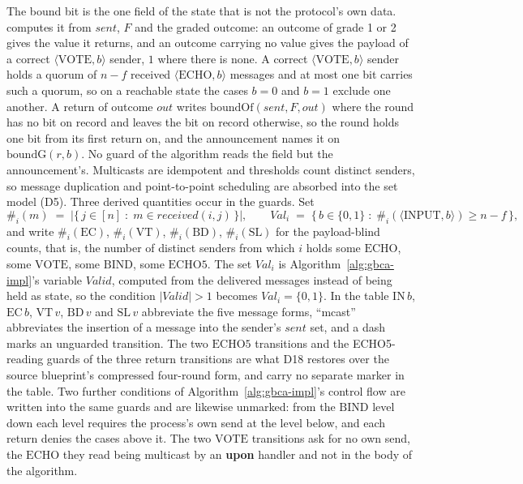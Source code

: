The bound bit is the one field of the state that is not the protocol's own data.
 computes it from $\mathit{sent}$, $F$ and the graded outcome: an outcome of grade 1 or 2 gives the value it returns, and an outcome carrying no value gives the payload of a correct $\langle\mathrm{VOTE}, b\rangle$ sender, $1$ where there is none.
A correct $\langle\mathrm{VOTE}, b\rangle$ sender holds a quorum of $n{-}f$ received $\langle\mathrm{ECHO}, b\rangle$ messages and at most one bit carries such a quorum, so on a reachable state the cases $b = 0$ and $b = 1$ exclude one another.
A return of outcome $out$ writes $\mathrm{boundOf}(\mathit{sent}, F, out)$ where the round has no bit on record and leaves the bit on record otherwise, so the round holds one bit from its first return on, and the announcement names it on $\mathrm{boundG}(r,b)$.
No guard of the algorithm reads the field but the announcement's.
Multicasts are idempotent and thresholds count distinct senders, so message duplication and point-to-point scheduling are absorbed into the set model (D5).
Three derived quantities occur in the guards.
Set
\[
  \#_i(m) \;=\; |\{\, j \in [n] \;:\; m \in \mathit{received}(i,j) \,\}|,
  \qquad
  \mathit{Val}_i \;=\;
    \{\, b \in \{0,1\} \;:\; \#_i(\langle\mathrm{INPUT}, b\rangle) \ge n - f \,\},
\]
and write $\#_i(\mathrm{EC})$, $\#_i(\mathrm{VT})$, $\#_i(\mathrm{BD})$, $\#_i(\mathrm{SL})$ for the payload-blind counts, that is, the number of distinct senders from which $i$ holds some $\mathrm{ECHO}$, some $\mathrm{VOTE}$, some $\mathrm{BIND}$, some $\mathrm{ECHO5}$.
The set $\mathit{Val}_i$ is Algorithm~\ref{alg:gbca-impl}'s variable $\mathit{Valid}$, computed from the delivered messages instead of being held as state, so the condition $|\mathit{Valid}| > 1$ becomes $\mathit{Val}_i = \{0,1\}$.
In the table $\mathrm{IN}\,b$, $\mathrm{EC}\,b$, $\mathrm{VT}\,v$, $\mathrm{BD}\,v$ and $\mathrm{SL}\,v$ abbreviate the five message forms, ``mcast'' abbreviates the insertion of a message into the sender's $\mathit{sent}$ set, and a dash marks an unguarded transition.
The two $\mathrm{ECHO5}$ transitions and the ECHO5-reading guards of the three return transitions are what D18 restores over the source blueprint's compressed four-round form, and carry no separate marker in the table.
Two further conditions of Algorithm~\ref{alg:gbca-impl}'s control flow are written into the same guards and are likewise unmarked: from the $\mathrm{BIND}$ level down each level requires the process's own send at the level below, and each return denies the cases above it.
The two $\mathrm{VOTE}$ transitions ask for no own send, the $\mathrm{ECHO}$ they read being multicast by an \textbf{upon} handler and not in the body of the algorithm.

